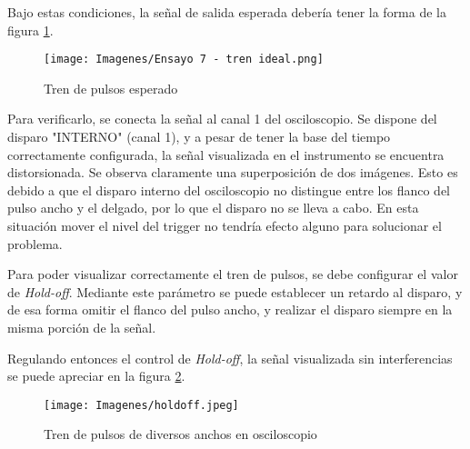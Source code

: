 Bajo estas condiciones, la señal de salida esperada debería tener la forma de la figura \ref{fig::TrenDePulsosEsperado}. 

\begin{figure}[H]
    \centering
        \texttt{[image: Imagenes/Ensayo 7 - tren ideal.png]}
    \caption{Tren de pulsos esperado}
    \label{fig::TrenDePulsosEsperado}
\end{figure}

Para verificarlo, se conecta la señal al canal 1 del osciloscopio. Se dispone del disparo "INTERNO" (canal 1), y a pesar de tener la base del tiempo correctamente configurada, la señal visualizada en el instrumento se encuentra distorsionada. Se observa claramente una superposición de dos imágenes. Esto es debido a que el disparo interno del osciloscopio no distingue entre los flanco del pulso ancho y el delgado, por lo que el disparo no se lleva a cabo. En esta situación mover el nivel del trigger no tendría efecto alguno para solucionar el problema.

Para poder visualizar correctamente el tren de pulsos, se debe configurar el valor de \textit{Hold-off}. Mediante este parámetro se puede establecer un retardo al disparo, y de esa forma omitir el flanco del pulso ancho, y realizar el disparo siempre en la misma porción de la señal.

Regulando entonces el control de \textit{Hold-off}, la señal visualizada sin interferencias se puede apreciar en la figura \ref{fig::TrenDePulsosOsc}.

\begin{table}[H]
    \centering
        \def\tablename{Tabla} 
        \caption{Cuadro de Controles}
        \label{tab:cont7}
\end{table}

\begin{figure}[H]
    \centering
        \texttt{[image: Imagenes/holdoff.jpeg]}
    \caption{Tren de pulsos de diversos anchos en osciloscopio}
\label{fig::TrenDePulsosOsc}
\end{figure}


\vspace{0.5cm}
